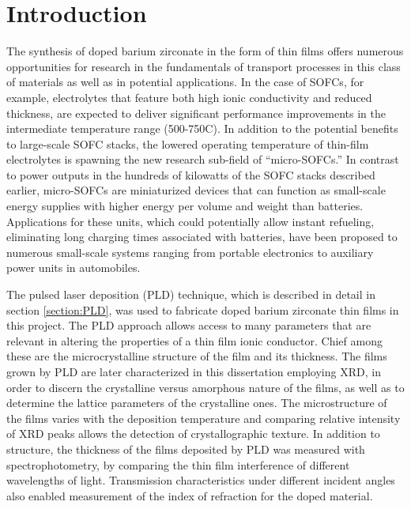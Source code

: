 \section{Introduction}
The synthesis of doped barium zirconate in the form of thin films offers numerous opportunities for research in the fundamentals of transport processes in this class of materials as well as in potential applications. In the case of SOFCs, for example, electrolytes that feature both high ionic conductivity and reduced thickness, are expected to deliver significant performance improvements in the intermediate temperature range (500-750\textdegree C). In addition to the potential benefits to large-scale SOFC stacks, the lowered operating temperature of thin-film electrolytes is spawning the new research sub-field of “micro-SOFCs.” In contrast to power outputs in the hundreds of kilowatts of the SOFC stacks described earlier, micro-SOFCs are miniaturized devices that can function as small-scale energy supplies with higher energy per volume and weight than batteries. Applications for these units, which could potentially allow instant refueling, eliminating long charging times associated with batteries, have been proposed to numerous small-scale systems ranging from portable electronics to auxiliary power units in automobiles.

The pulsed laser deposition (PLD) technique, which is described in detail in section \ref{section:PLD}, was used to fabricate doped barium zirconate thin films in this project. The PLD approach allows access to many parameters that are relevant in altering the properties of a thin film ionic conductor. Chief among these are the microcrystalline structure of the film and its thickness. The films grown by PLD are later characterized in this dissertation employing XRD, in order to discern the crystalline versus amorphous nature of the films, as well as to determine the lattice parameters of the crystalline ones. The microstructure of the films varies with the deposition temperature and comparing relative intensity of XRD peaks allows the detection of crystallographic texture. In addition to structure, the thickness of the films deposited by PLD was measured with spectrophotometry, by comparing the thin film interference of different wavelengths of light. Transmission characteristics under different incident angles also enabled measurement of the index of refraction for the doped material. 
